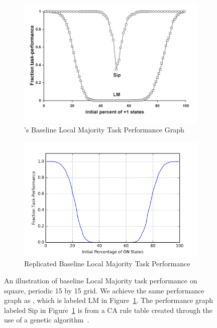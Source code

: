 \documentclass[a4paper,11pt]{article}
\begin{document}
\begin{figure}[htp]
\centering
  \begin{subfigure}[t]{0.85\textwidth}
  \includegraphics[width=\textwidth]{ch5_figs/me07_fig2_LMBaseline}
  \caption{\citeauthor{me07}'s Baseline Local Majority Task Performance Graph}
  \label{fig:me07_baseline}
  \end{subfigure}

  \begin{subfigure}[t]{0.85\textwidth}
  \centering
  \includegraphics[width=\textwidth]{ch5_figs/lm_baseline_reg_tor}
  \caption{Replicated Baseline Local Majority Task Performance}
  \end{subfigure}
\caption[Replication of \citeauthor{me07}'s Baseline Local Majority Performance]{
  An illustration of baseline Local Majority task performance on square, periodic 15 by 15 grid. We achieve the same performance graph as \citeauthor{me07}, which is labeled LM in Figure~\ref{fig:me07_baseline}. The performance graph labeled Sip in Figure~\ref{fig:me07_baseline} is from a CA rule table created through the use of a genetic algorithm~\cite{me07}.
}
\label{fig:me07_baseline_rep}
\end{figure}
\end{document}
